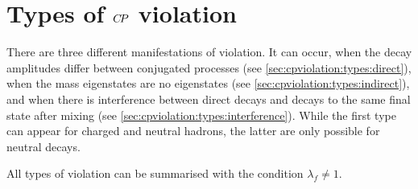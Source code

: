 
\section{Types of \texorpdfstring{${C\!P}$}{CP} violation}
\label{sec:cpviolation:types}

There are three different manifestations of \CP violation. It can occur, when
the decay amplitudes differ between \CP conjugated processes (see
\cref{sec:cpviolation:types:direct}), when the mass eigenstates are no \CP
eigenstates (see \cref{sec:cpviolation:types:indirect}), and when there is
interference between direct decays and decays to the same final state after
mixing (see \cref{sec:cpviolation:types:interference}). While the first type
can appear for charged and neutral hadrons, the latter are only possible for
neutral decays.

All types of \CP violation can be summarised with the condition $\lambda_f
\neq 1$.






